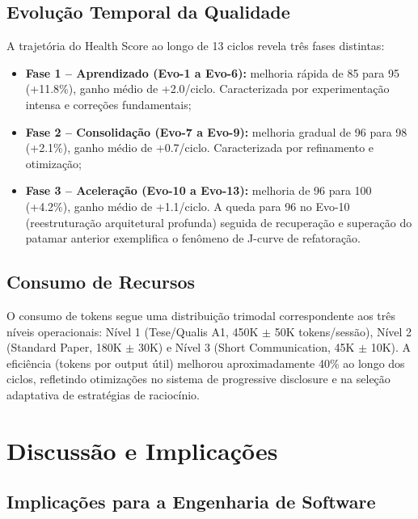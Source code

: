 \documentclass[12pt,a4paper,sumario=tradicional,openany]{abntex2}
\begin{document}
\section{Evolução Temporal da Qualidade}

A trajetória do Health Score ao longo de 13 ciclos revela três fases distintas:

\begin{itemize}
    \item \textbf{Fase 1 -- Aprendizado (Evo-1 a Evo-6):} melhoria rápida de 85 para 95 (+11.8\%), ganho médio de +2.0/ciclo. Caracterizada por experimentação intensa e correções fundamentais;
    \item \textbf{Fase 2 -- Consolidação (Evo-7 a Evo-9):} melhoria gradual de 96 para 98 (+2.1\%), ganho médio de +0.7/ciclo. Caracterizada por refinamento e otimização;
    \item \textbf{Fase 3 -- Aceleração (Evo-10 a Evo-13):} melhoria de 96 para 100 (+4.2\%), ganho médio de +1.1/ciclo. A queda para 96 no Evo-10 (reestruturação arquitetural profunda) seguida de recuperação e superação do patamar anterior exemplifica o fenômeno de J-curve de refatoração.
\end{itemize}

\section{Consumo de Recursos}

O consumo de tokens segue uma distribuição trimodal correspondente aos três níveis operacionais: Nível 1 (Tese/Qualis A1, 450K $\pm$ 50K tokens/sessão), Nível 2 (Standard Paper, 180K $\pm$ 30K) e Nível 3 (Short Communication, 45K $\pm$ 10K). A eficiência (tokens por output útil) melhorou aproximadamente 40\% ao longo dos ciclos, refletindo otimizações no sistema de progressive disclosure e na seleção adaptativa de estratégias de raciocínio.

\chapter{Discussão e Implicações}

\section{Implicações para a Engenharia de Software}
\end{document}
